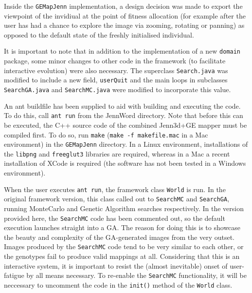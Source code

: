 \documentclass{article}
\begin{document}
Inside the \texttt{GEMapJenn} implementation, a design decision was made to export the viewpoint of
the invidiual at the point of fitness allocation (for example after the user has had a chance to 
explore the image via zooming, rotating or panning) as opposed to the default state of the freshly
initialised individual.

It is important to note that in addition to the implementation of a new \texttt{domain} 
package, some minor changes to other code in the framework (to facilitate interactive evolution)
were also necessary. The superclass \texttt{Search.java} was modified to include a new field, 
\texttt{userQuit} and the main loops in subclasses \texttt{SearchGA.java} and \texttt{SearchMC.java} 
were modified to incorporate this value.

An ant buildfile has been supplied to aid with building and executing the code. To do this, call 
\texttt{ant run} from the JennWord directory. Note that before this can be executed, the 
C++ source code of the combined Jenn3d+GE mapper must be compiled first. To do
so, run \texttt{make} (\texttt{make -f makefile.mac} in a Mac environment) in
the \texttt{GEMapJenn} directory. In a Linux environment, installations of
the \texttt{libpng} and \texttt{freeglut3} libraries are required, whereas in a Mac 
a recent installation of XCode is required (the software has not been tested in a 
Windows environment).

When the user executes \texttt{ant run}, the framework class \texttt{World} is run. In the original 
framework version, this class called out to \texttt{SearchMC} and \texttt{SearchGA}, running MonteCarlo
and Genetic Algorithm searches respectively. In the version provided here, the \texttt{SearchMC} code
has been commented out, so the default execution launches straight into a GA. The reason for doing this
is to showcase the beauty and complexity of the GA-generated images from the very outset. Images produced
by the \texttt{SearchMC} code tend to be very similar to each other, or the genotypes fail to produce valid 
mappings at all. Considering that this is an interactive system, it is important to resist the (almost 
inevitable) onset of user-fatigue by all means necessary. To re-enable the \texttt{SearchMC} functionality,
it will be neccessary to uncomment the code in the \texttt{init()} method of the \texttt{World} class.
\end{document}
